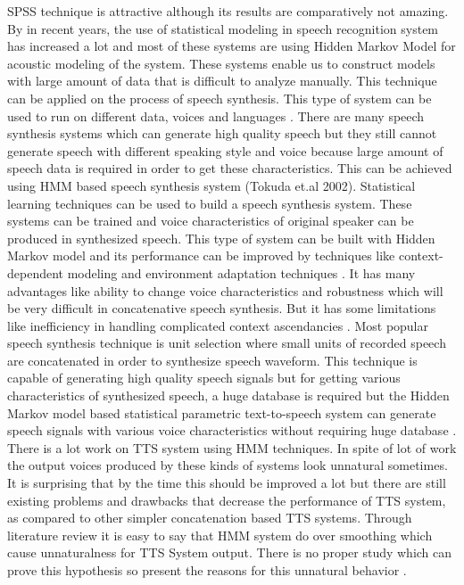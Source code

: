 SPSS technique is attractive although its results are comparatively not amazing. By \cite{donovan1999hidden} in recent years, 
the use of statistical modeling in speech recognition system has increased a lot and most of these
systems are using Hidden Markov Model for acoustic modeling of the system. These systems enable us to construct models
with large amount of data that is difficult to analyze manually. This technique can be applied on the process of speech
synthesis. This type of system can be used to run on different data, voices and languages \cite{donovan1999hidden}. 
There are many speech synthesis systems which can generate high quality speech but they still cannot generate speech
with different speaking style and voice because large amount of speech data is required in order to get these characteristics.
This can be achieved using HMM based speech synthesis system (Tokuda et.al 2002). Statistical learning techniques can be
used to build a speech synthesis system. These systems can be trained and voice characteristics of original speaker can be
produced in synthesized speech. This type of system can be built with Hidden Markov model and its performance can be
improved by techniques like context-dependent modeling and environment adaptation techniques \cite{tokuda2000speech}. It has
many advantages like ability to change voice characteristics and robustness which will be very difficult in concatenative
speech synthesis. But it has some limitations like inefficiency in handling complicated context ascendancies \cite{ze2013statistical}. 
Most popular speech synthesis technique is unit selection where small units of recorded speech are concatenated in
order to synthesize speech waveform. This technique is capable of generating high quality speech signals but for getting
various characteristics of synthesized speech, a huge database is required but the Hidden Markov model based statistical
parametric text-to-speech system can generate speech signals with various voice characteristics without requiring huge
database \cite{zen2007hmm}. There is a lot work on TTS system using HMM techniques. In spite of lot of work the output
voices produced by these kinds of systems look unnatural sometimes. It is surprising that by the time this should be improved
a lot but there are still existing problems and drawbacks that decrease the performance of TTS system, as compared to other
simpler concatenation based TTS systems. Through literature review it is easy to say that HMM system do over smoothing
which cause unnaturalness for TTS System output. There is no proper study which can prove this hypothesis so \cite{merritt2013investigating} 
present the reasons for this unnatural behavior \cite{merritt2013investigating}.


